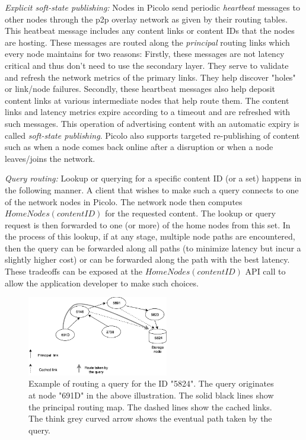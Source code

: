 {\em Explicit soft-state publishing:} Nodes in Picolo send periodic {\em heartbeat} messages to other nodes through the
p2p overlay network as given by their routing tables. This heatbeat message includes any content links or content IDs
that the nodes are hosting. These messages are routed along the {\em principal} routing links which every node maintains
for two reasons: Firstly, these messages are not latency critical and thus don't need to use the secondary layer. They
serve to validate and refresh the network metrics of the primary links. They help discover "holes" or link/node
failures. Secondly, these heartbeat messages also help deposit content links at various intermediate nodes that help
route them. The content links and latency metrics expire according to a timeout and are refreshed with such messages.
This operation of advertising content with an automatic expiry is called {\em soft-state publishing}. Picolo also
supports targeted re-publishing of content such as when a node comes back online after a disruption or when a node
leaves/joins the network.

{\em Query routing:} Lookup or querying for a specific content ID (or a set) happens in the following manner. A client
that wishes to make such a query connects to one of the network nodes in Picolo. The network node then computes
\(HomeNodes(contentID)\) for the requested content. The lookup or query request is then forwarded to one (or more)
of the home nodes from this set. In the process of this lookup, if at any stage, multiple node paths are encountered,
then the query can be forwarded along all paths (to minimize latency but incur a slightly higher cost) or can be
forwarded along the path with the best latency. These tradeoffs can be exposed at the \(HomeNodes(contentID)\) API
call to allow the application developer to make such choices.

\begin{figure}[h]
    \centering
    \includegraphics[width=0.55\textwidth]{fig/routing-eg.png}
  \caption{Example of routing a query for the ID "5824". The query originates at node "691D" in the above illustration.
    The solid black lines show the principal routing map. The dashed lines show the cached links. The think grey curved
    arrow shows the eventual path taken by the query.}
    \label{fig:routing-eg}
\end{figure}

